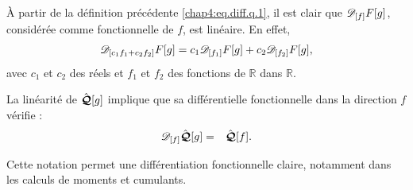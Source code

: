 
À partir de la définition précédente \eqref{chap4:eq.diff.q.1}, il est clair que
$\displaystyle \mathscr{D}_{[f]} F[g]$, considérée comme fonctionnelle de $f$, est linéaire. En effet,
\begin{eqnarray}\label{chap4:eq.diff.lin.q.1}
	\mathscr{D}_{[c_1f_1 + c_2 f_2]}F[g] = c_1 \mathscr{D}_{[f_1]}F[g] + c_2 \mathscr{D}_{[f_2]}F[g],
\end{eqnarray}
avec $c_1$ et $c_2$ des réels et $f_1$ et $f_2$ des fonctions de $\mathbb{R}$ dans $\mathbb{R}$.\\

\smallskip

La linéarité de $\hat{\bm{\mathcal{Q}}}[g]$ implique que sa différentielle fonctionnelle dans la direction $f$ vérifie \cite{Wheeler_FieldTheory_Ch5,Gourdon_Analyse}:
\begin{eqnarray}
	\mathscr{D}_{[f]} \hat{\bm{\mathcal{Q}}}[g] & =  & \hat{\bm{\mathcal{Q}}}[f] .
\end{eqnarray}

\medskip

Cette notation permet une différentiation fonctionnelle claire, notamment dans les calculs de moments et cumulants.

